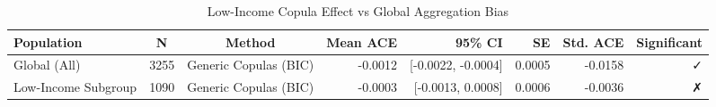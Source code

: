 \begin{table}

\caption{Low-Income Copula Effect vs Global Aggregation Bias}
\centering
\begin{tabular}[t]{l|c|c|r|r|r|r|r}
\hline
Population & N & Method & Mean ACE & 95\% CI & SE & Std. ACE & Significant\\
\hline
Global (All) & 3255 & Generic Copulas (BIC) & -0.0012 & [-0.0022, -0.0004] & 0.0005 & -0.0158 & ✓\\
\hline
Low-Income Subgroup & 1090 & Generic Copulas (BIC) & -0.0003 & [-0.0013, 0.0008] & 0.0006 & -0.0036 & ✗\\
\hline
\end{tabular}
\end{table}

